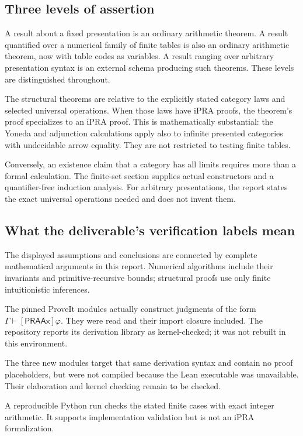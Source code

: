 \subsection{Three levels of assertion}
A result about a fixed presentation is an ordinary arithmetic theorem.
A result quantified over a numerical family of finite tables is also an
ordinary arithmetic theorem, now with table codes as variables.
A result ranging over arbitrary presentation syntax is an external
schema producing such theorems. These levels are distinguished throughout.

The structural theorems are relative to the explicitly stated category
laws and selected universal operations. When those laws have iPRA proofs,
the theorem's proof specializes to an iPRA proof. This is mathematically
substantial: the Yoneda and adjunction calculations apply also to infinite
presented categories with undecidable arrow equality. They are not
restricted to testing finite tables.

Conversely, an existence claim that a category has all limits
requires more than a formal calculation. The finite-set section supplies
actual constructors and a quantifier-free induction analysis. For
arbitrary presentations, the report states the exact universal operations
needed and does not invent them.

\subsection{What the deliverable's verification labels mean}
\begin{description}[style=nextline]
\item[Human proof]
The displayed assumptions and conclusions are connected by complete
mathematical arguments in this report. Numerical algorithms include
their invariants and primitive-recursive bounds; structural proofs use
only finite intuitionistic inferences.
\item[Reused object-language source]
The pinned ProveIt modules actually construct judgments of the form
$\Gamma\vdash[\mathsf{PRAAx}]\varphi$. They were read and their import
closure included. The repository reports its derivation library as
kernel-checked; it was not rebuilt in this environment.
\item[New Lean integration draft]
The three new modules target that same derivation syntax and contain
no proof placeholders, but were not compiled because the Lean executable
was unavailable. Their elaboration and kernel checking remain to be checked.
\item[Exact finite-model check]
A reproducible Python run checks the stated finite cases with exact
integer arithmetic. It supports implementation validation but is not
an iPRA formalization.
\end{description}


